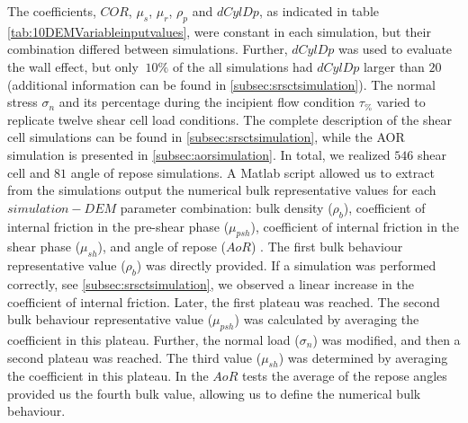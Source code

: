 The coefficients, $COR$, $\mu_s$, $\mu_r$,
$\rho_p$ and $dCylDp$, as indicated in table \ref{tab:10DEMVariableinputvalues},
were constant in each simulation, but their combination differed between
simulations.
Further, $dCylDp$ was used to evaluate the wall effect, but only $~10\%$ of the
all simulations had $dCylDp$ larger than $20$ (additional information can be found in \ref{subsec:srsctsimulation}). 
The normal stress $\sigma_n$ and its
percentage during the incipient flow condition $\tau_{\%}$
varied to replicate twelve shear cell load conditions. 
The complete description of the shear cell simulations can be found in \ref{subsec:srsctsimulation}, 
while the AOR simulation is presented in \ref{subsec:aorsimulation}.
In total, we realized $546$ shear cell and $81$ angle of repose simulations.
A Matlab script allowed us to extract from the simulations output the numerical
bulk representative values for
each $simulation-DEM$ parameter combination:
bulk density ($\rho_b$),
coefficient of internal friction in the pre-shear phase ($\mu_{psh}$),
coefficient of internal friction in the shear phase ($\mu_{sh}$),
and angle of repose ($AoR$) .
The first bulk behaviour representative value ($\rho_b$) was directly provided. 
If a simulation was performed correctly, see \ref{subsec:srsctsimulation}, we
observed a linear increase in the coefficient of internal friction.
Later, the first plateau was reached. 
The second bulk behaviour representative value ($\mu_{psh}$) was calculated by averaging the coefficient in this plateau. 
Further, the normal load ($\sigma_n$) was modified, and then a second plateau
was reached.
The third value ($\mu_{sh}$) was determined by averaging the coefficient in this plateau. 
In the $AoR$ tests the average of the repose angles provided us the fourth bulk
value, allowing us to define the numerical bulk behaviour.






